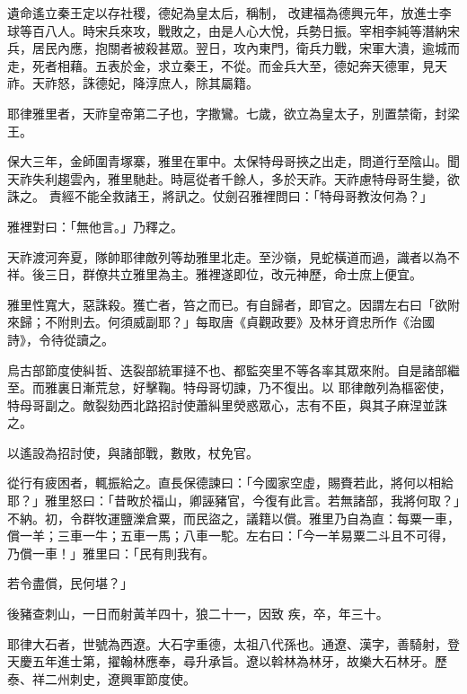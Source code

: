 \begin{pinyinscope}
 遺命遙立秦王定以存社稷，德妃為皇太后，稱制，
 改建福為德興元年，放進士李球等百八人。時宋兵來攻，戰敗之，由是人心大悅，兵勢日振。宰相李純等潛納宋兵，居民內應，抱關者被殺甚眾。翌日，攻內東門，衛兵力戰，宋軍大潰，逾城而走，死者相藉。五表於金，求立秦王，不從。而金兵大至，德妃奔天德軍，見天祚。天祚怒，誅德妃，降淳庶人，除其屬籍。



 耶律雅里者，天祚皇帝第二子也，字撒鸞。七歲，欲立為皇太子，別置禁衛，封梁王。



 保大三年，金師圍青塚寨，雅里在軍中。太保特母哥挾之出走，問道行至陰山。聞天祚失利趨雲內，雅里馳赴。時扈從者千餘人，多於天祚。天祚慮特母哥生變，欲誅之。
 責經不能全救諸王，將訊之。仗劍召雅裡問曰：「特母哥教汝何為？」



 雅裡對曰：「無他言。」乃釋之。



 天祚渡河奔夏，隊帥耶律敵列等劫雅里北走。至沙嶺，見蛇橫道而過，識者以為不祥。後三日，群僚共立雅里為主。雅裡遂即位，改元神歷，命士庶上便宜。



 雅里性寬大，惡誅殺。獲亡者，笞之而已。有自歸者，即官之。因謂左右曰「欲附來歸；不附則去。何須威副耶？」每取唐《貞觀政要》及林牙資忠所作《治國詩》，令待從讀之。



 烏古部節度使糾哲、迭裂部統軍撻不也、都監突里不等各率其眾來附。自是諸部繼至。而雅裏日漸荒怠，好擊鞠。特母哥切諫，乃不復出。以
 耶律敵列為樞密使，特母哥副之。敵裂劾西北路招討使蕭糾里熒惑眾心，志有不臣，與其子麻涅並誅之。



 以遙設為招討使，與諸部戰，數敗，杖免官。



 從行有疲困者，輒振給之。直長保德諫曰：「今國家空虛，賜賚若此，將何以相給耶？」雅里怒曰：「昔畋於福山，卿誣豬官，今復有此言。若無諸部，我將何取？」不納。初，令群牧運鹽濼倉粟，而民盜之，議籍以償。雅里乃自為直：每粟一車，償一羊；三車一牛；五車一馬；八車一駝。左右曰：「今一羊易粟二斗且不可得，乃償一車！」雅里曰：「民有則我有。



 若令盡償，民何堪？」



 後豬查刺山，一日而射黃羊四十，狼二十一，因致
 疾，卒，年三十。



 耶律大石者，世號為西遼。大石字重德，太祖八代孫也。通遼、漢字，善騎射，登天慶五年進士第，擢翰林應奉，尋升承旨。遼以斡林為林牙，故樂大石林牙。歷泰、祥二州刺史，遼興軍節度使。




\end{pinyinscope}

